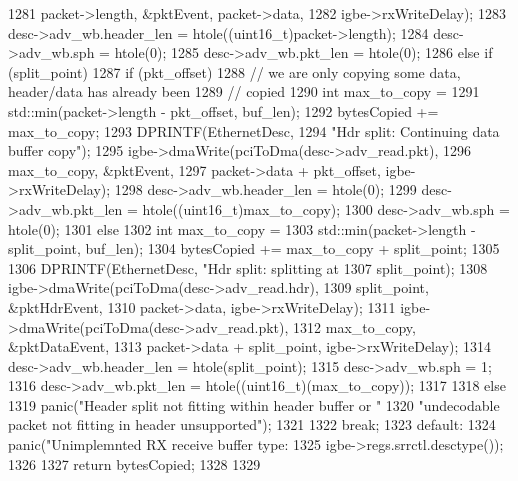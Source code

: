 \begin{DoxyCode}
{{{1281                            packet->length, &pktEvent, packet->data,
1282                            igbe->rxWriteDelay);
1283             desc->adv_wb.header_len = htole((uint16_t)packet->length);
1284             desc->adv_wb.sph = htole(0);
1285             desc->adv_wb.pkt_len = htole(0);
1286         } else if (split_point) {
1287             if (pkt_offset) {
1288                 // we are only copying some data, header/data has already been
1289                 // copied
1290                 int max_to_copy =
1291                     std::min(packet->length - pkt_offset, buf_len);
1292                 bytesCopied += max_to_copy;
1293                 DPRINTF(EthernetDesc,
1294                         "Hdr split: Continuing data buffer copy\n");
1295                 igbe->dmaWrite(pciToDma(desc->adv_read.pkt),
1296                                max_to_copy, &pktEvent,
1297                                packet->data + pkt_offset, igbe->rxWriteDelay);
1298                 desc->adv_wb.header_len = htole(0);
1299                 desc->adv_wb.pkt_len = htole((uint16_t)max_to_copy);
1300                 desc->adv_wb.sph = htole(0);
1301             } else {
1302                 int max_to_copy =
1303                     std::min(packet->length - split_point, buf_len);
1304                 bytesCopied += max_to_copy + split_point;
1305                 
1306                 DPRINTF(EthernetDesc, "Hdr split: splitting at %
1307                         split_point);
1308                 igbe->dmaWrite(pciToDma(desc->adv_read.hdr),
1309                                split_point, &pktHdrEvent,
1310                                packet->data, igbe->rxWriteDelay);
1311                 igbe->dmaWrite(pciToDma(desc->adv_read.pkt),
1312                                max_to_copy, &pktDataEvent,
1313                                packet->data + split_point, igbe->rxWriteDelay);
1314                 desc->adv_wb.header_len = htole(split_point);
1315                 desc->adv_wb.sph = 1;
1316                 desc->adv_wb.pkt_len = htole((uint16_t)(max_to_copy));
1317             }
1318         } else {
1319             panic("Header split not fitting within header buffer or "
1320                   "undecodable packet not fitting in header unsupported\n");
1321         }
1322         break;
1323       default:
1324         panic("Unimplemnted RX receive buffer type: %
1325               igbe->regs.srrctl.desctype());
1326     }
1327     return bytesCopied;
1328 
1329 }
\end{DoxyCode}


